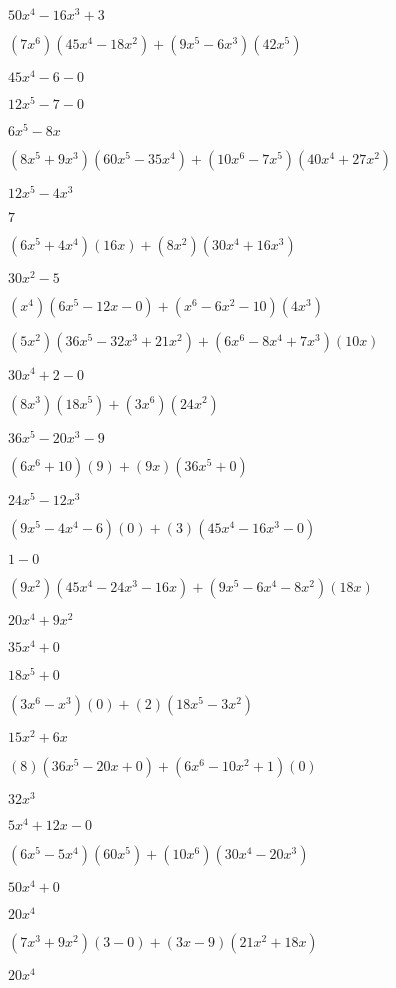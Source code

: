 \documentclass{article}
\begin{document}
\begin{multicols}{2}
$50x^{4}-16x^{3}+3$\item $(7x^{6})(45x^{4}-18x^{2})+(9x^{5}-6x^{3})(42x^{5})$\item $45x^{4}-6-0$\item $12x^{5}-7-0$\item $6x^{5}-8x$\item $(8x^{5}+9x^{3})(60x^{5}-35x^{4})+(10x^{6}-7x^{5})(40x^{4}+27x^{2})$\item $12x^{5}-4x^{3}$\item $7$\item $(6x^{5}+4x^{4})(16x)+(8x^2)(30x^{4}+16x^{3})$\item $30x^{2}-5$\item $(x^{4})(6x^{5}-12x-0)+(x^{6}-6x^2-10)(4x^{3})$\item $(5x^2)(36x^{5}-32x^{3}+21x^{2})+(6x^{6}-8x^{4}+7x^{3})(10x)$\item $30x^{4}+2-0$\item $(8x^{3})(18x^{5})+(3x^{6})(24x^{2})$\item $36x^{5}-20x^{3}-9$\item $(6x^{6}+10)(9)+(9x)(36x^{5}+0)$\item $24x^{5}-12x^{3}$\item $(9x^{5}-4x^{4}-6)(0)+(3)(45x^{4}-16x^{3}-0)$\item $1-0$\item $(9x^2)(45x^{4}-24x^{3}-16x)+(9x^{5}-6x^{4}-8x^2)(18x)$\item $20x^{4}+9x^{2}$\item $35x^{4}+0$\item $18x^{5}+0$\item $(3x^{6}-x^{3})(0)+(2)(18x^{5}-3x^{2})$\item $15x^{2}+6x$\item $(8)(36x^{5}-20x+0)+(6x^{6}-10x^2+1)(0)$\item $32x^{3}$\item $5x^{4}+12x-0$\item $(6x^{5}-5x^{4})(60x^{5})+(10x^{6})(30x^{4}-20x^{3})$\item $50x^{4}+0$\item $20x^{4}$\item $(7x^{3}+9x^2)(3-0)+(3x-9)(21x^{2}+18x)$\item $20x^{4}$\item 
\end{multicols}
\end{document}
